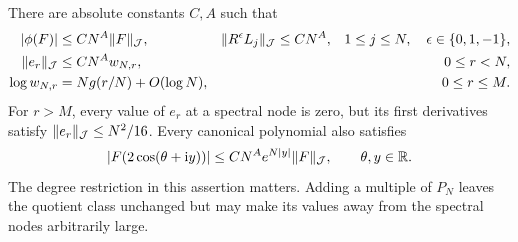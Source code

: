 \begin{lemma}\label{cs:conditioning-lemma}
There are absolute constants \(C,A\) such that
\begin{align}
 |\phi(F)|&\le CN^A\lVert F\rVert_{\mathcal J},&
 \lVert R^\epsilon L_j\rVert_{\mathcal J}&\le CN^A,
 &1\le j\le N,\quad\epsilon\in\{0,1,-1\},\label{cs:finite-cost}\\
 \lVert e_r\rVert_{\mathcal J}&\le CN^A w_{N,r},&&&0\le r<N,\label{cs:basis-norm}\\
 \log w_{N,r}&=Ng(r/N)+O(\log N),&&&0\le r\le M.\label{cs:weight-rate}
\end{align}
For \(r>M\), every value of \(e_r\) at a spectral node is zero,
but its first derivatives satisfy \(\lVert e_r\rVert_{\mathcal J}\le N^2/16\).
Every canonical polynomial also satisfies
\begin{equation}\label{cs:ellipse}
 |F(2\cos(\theta+\mathrm i y))|
       \le CN^A e^{N|y|}\lVert F\rVert_{\mathcal J},\qquad \theta,y\in\mathbb R.
\end{equation}
The degree restriction in this assertion matters. Adding a multiple
of $P_N$ leaves the quotient class unchanged but may make its values away
from the spectral nodes arbitrarily large.
\end{lemma}
